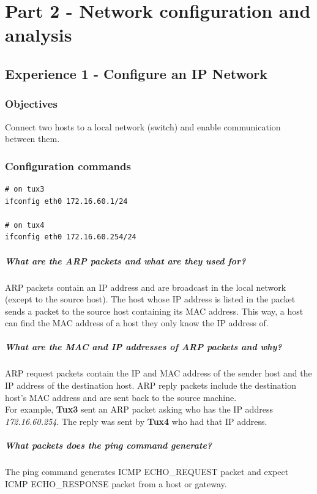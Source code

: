 \documentclass[11pt]{report}
\begin{document}
\chapter{Part 2 - Network configuration and analysis}

\section{Experience 1 - Configure an IP Network}

\subsection{Objectives}
Connect two hosts to a local network (switch) and enable communication between
them.

\subsection{Configuration commands}
\begin{lstlisting}
# on tux3
ifconfig eth0 172.16.60.1/24

# on tux4
ifconfig eth0 172.16.60.254/24
\end{lstlisting}

\paragraph{What are the ARP packets and what are they used for?}
ARP packets contain an IP address and are broadcast in the local network
(except to the source host). The host whose IP address is listed in the packet
sends a packet to the source host containing its MAC address. This way,
a host can find the MAC address of a host they only know the IP address of.

\paragraph{What are the MAC and IP addresses of ARP packets and why?}
ARP request packets contain the IP and MAC address of the sender host and the IP
address of the destination host. ARP reply packets include the destination
host's MAC address and are sent back to the source machine.\\
For example, \textbf{Tux3} sent an ARP packet asking who has the IP address
\textit{172.16.60.254}. The reply was sent by \textbf{Tux4} who had that IP address.

\paragraph{What packets does the ping command generate?}
The ping command generates ICMP ECHO\_REQUEST packet and expect
ICMP ECHO\_RESPONSE packet from a host or gateway.
\end{document}
